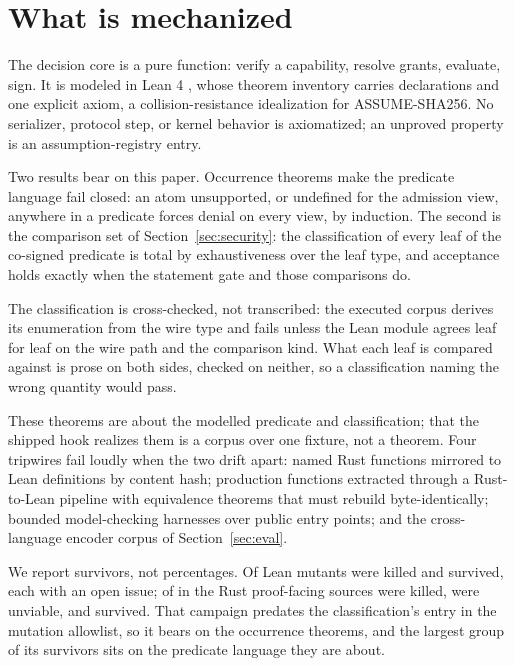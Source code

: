 \section{What is mechanized}
\label{sec:formal}

The decision core is a pure function: verify a capability, resolve grants,
evaluate, sign. It is modeled in Lean 4 \cite{lean4}, whose theorem
inventory carries \PSTheoremCount{} declarations and one explicit axiom, a
collision-resistance idealization for ASSUME-SHA256. No serializer, protocol step, or kernel behavior is axiomatized;
an unproved property is an assumption-registry entry.

Two results bear on this paper. Occurrence theorems make the predicate language
fail closed: an atom unsupported, or undefined for the admission view, anywhere
in a predicate forces denial on every view, by induction. The second is the
comparison set of Section~\ref{sec:security}: the classification of every leaf of the co-signed
predicate is total by exhaustiveness over the leaf type, and acceptance
holds exactly when the statement gate and those comparisons do.

The classification is cross-checked, not transcribed: the executed corpus
derives its enumeration from the wire type and fails unless the Lean module
agrees leaf for leaf on the wire path and the comparison kind. What each leaf is
compared against is prose on both sides, checked on neither, so a
classification naming the wrong quantity would pass.

 These theorems are about the
modelled predicate and classification; that the shipped hook realizes them
is a corpus over one fixture, not a theorem. Four tripwires fail
loudly when the two drift apart: named Rust functions mirrored to Lean
definitions by content hash; \PSAeneasFunctionCount{} production functions
extracted through a Rust-to-Lean pipeline with equivalence theorems that must
rebuild byte-identically; \PSKaniHarnessCount{} bounded model-checking harnesses
over public entry points; and the cross-language encoder corpus of
Section~\ref{sec:eval}.

We report survivors, not percentages. Of \PSLeanMutants{} Lean
mutants \PSLeanMutantsKilled{} were killed and \PSLeanMutantsSurvived{} survived, each
with an open issue; of \PSProofMutants{} in the Rust proof-facing sources
\PSProofMutantsKilled{} were killed, \PSProofMutantsUnviable{} were unviable,
and \PSProofMutantsSurvived{} survived.
That campaign predates the classification's entry in the mutation allowlist, so
it bears on the occurrence theorems, and the largest group of its survivors
sits on the predicate language they are about.

